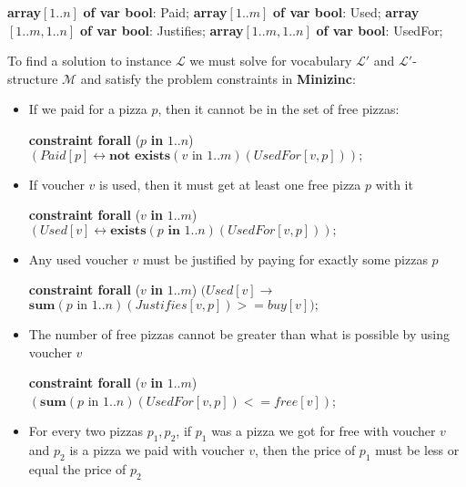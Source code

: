 \documentclass[conference]{IEEEtran}
\newcommand\tab[1][0.3cm]{\hspace*{#1}}
\begin{document}
\begin{algorithmic}
\State \textbf{array}$[1..n]$ \textbf{of var bool}: Paid;
\State \textbf{array}$[1..m]$ \textbf{of var bool}: Used;
\State \textbf{array}$[1..m, 1..n]$ \textbf{of var bool}: Justifies;
\State \textbf{array}$[1..m, 1..n]$ \textbf{of var bool}: UsedFor;
\\
\end{algorithmic}
\tab To find a solution to instance $\mathcal{L}$ we must solve for vocabulary $\mathcal{L'}$ and $\mathcal{L'}$-structure $\mathcal{M}$ and satisfy the problem constraints in \textbf{Minizinc}:
\begin{itemize}
\item If we paid for a pizza $p$, then it cannot be in the set of free pizzas:
\begin{algorithmic}
\State \textbf{constraint forall} ($p$ \textbf{in} $1..n$)
\State \tab\tab $(Paid[p]\leftrightarrow
           \textbf{not exists}(v \text{ in } 1..m)(UsedFor[v, p]));$
\\
\end{algorithmic}
\item If voucher $v$ is used, then it must get at least one free pizza $p$ with it
\begin{algorithmic}
\State \textbf{constraint forall} ($v$ \textbf{in} $1..m$)
\State \tab\tab $(Used[v]\leftrightarrow
           \textbf{exists}(p \textbf{ in } 1..n)(UsedFor[v, p]));$
\\
\end{algorithmic}
\item Any used voucher $v$ must be justified by paying for exactly some pizzas $p$
\begin{algorithmic}
\State \textbf{constraint forall} ($v$ \textbf{in} $1..m$)
\State \tab\tab $(Used[v]\rightarrow$
\State \tab\tab\tab $\textbf{sum}(p \text{ in } 1..n)(Justifies[v, p]) >= buy[v]);$
\\
\end{algorithmic}
\item The number of free pizzas cannot be greater than what is possible by using voucher $v$
\begin{algorithmic}
\State \textbf{constraint forall} ($v$ \textbf{in} $1..m$)
\State \tab\tab $(\textbf{sum}(p \text{ in } 1..n)(UsedFor[v, p]) <= free[v])$;
\\
\end{algorithmic}
\item For every two pizzas $p_1, p_2$, if $p_1$ was a pizza we got for free with voucher $v$ and $p_2$ is a pizza we paid with voucher $v$, then the price of $p_1$ must be less or equal the price of $p_2$
\end{itemize}
\end{document}
